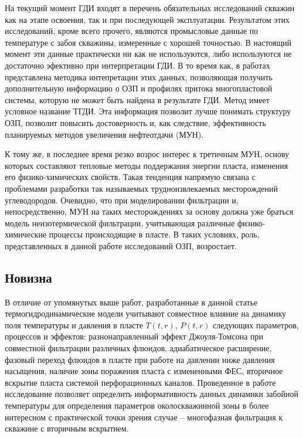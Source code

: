 	На текущий момент ГДИ входят в перечень обязательных исследований скважин как на этапе освоения, так и при последующей эксплуатации.
	Результатом этих исследований, кроме всего прочего, являются промысловые данные по температуре с забоя скважины, измеренные с хорошей точностью.
	В настоящий момент эти данные практически ни как не используются, либо используются не достаточно эфективно при интерпретации ГДИ.
	В то время как, в работах \cite{checkalyuk, ramazanov_old2, valiullin, ramazanov_diss, ramazanov_spe, ramazanov_spe1, posv} представлена методика интепретации этих данных, позволяющая получить дополнительную информацию о ОЗП и профилях притока многопластовой системы, которую не может быть найдена в результате ГДИ. Метод имеет условное название ТГДИ.
	Эта информация позволит лучше понимать структуру ОЗП, позволит повысить достоверность и, как следствие, эффективность планируемых методов увеличения нефтеотдачи (МУН).
	
	К тому же, в последнее время резко возрос интерес к третичным МУН, основу которых составляют тепловые методы поддержания энергии пласта, изменения его физико-химических свойств.
	Такая тенденция напрямую связана с проблемами разработки так называемых трудноизвлекаемых месторождений углеводородов.
	Очевидно, что при моделировании фильтрации и, непосредственно, МУН на таких месторождениях за основу должна уже браться модель неизотермической фильтрации, учитывающая различные физико-химические процессы происходящие в пласте.
	В таких условиях, роль, представленных в данной работе исследований ОЗП, возростает.
	
\subsection*{Новизна}
	В отличие от упомянутых выше работ, разработанные в данной статье термогидродинамические модели учитывают совместное влияние на динамику поля температуры и давления в пласте $T\left(t, r\right)$, $P\left(t,r\right)$ следующих параметров, процессов и эффектов: разнонаправленный эффект Джоуля-Томсона при совместной фильтрации различных флюидов, адиабатическое расширение, фазовый переход флюидов в пласте при работе на давлении ниже давления насыщения, наличие зоны поражения пласта с измененными ФЕС, вторичное вскрытие пласта системой перфорационных каналов. Проведенное в работе исследование позволяет определить информативность данных динамики забойной температуры для определения параметров околоскважинной зоны в более интересном с практической точки зрения случае – многофазная фильтрация к скважине с вторичным вскрытием.

